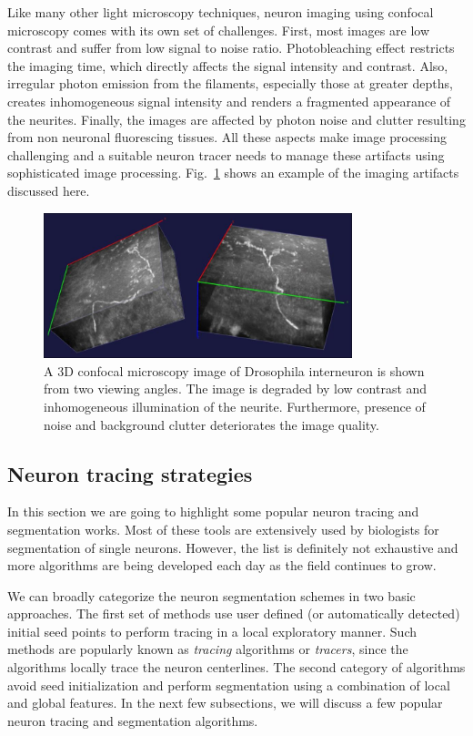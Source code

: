 Like many other light microscopy techniques, neuron imaging using confocal microscopy comes with its own set of challenges. First, most images are low contrast and suffer from low signal to noise ratio. Photobleaching effect restricts the imaging time, which directly affects the signal intensity and contrast. Also, irregular photon emission from the filaments, especially those at greater depths, creates inhomogeneous signal intensity and renders a fragmented appearance of the neurites. Finally, the images are affected by photon noise and clutter resulting from non neuronal fluorescing tissues. All these aspects make image processing challenging and a suitable neuron tracer needs to manage these artifacts using sophisticated image processing.  Fig.~\ref{fig:neuron_stack_demo} shows an example of the imaging artifacts discussed here.
\begin{figure}[t]
\centering
\includegraphics[width=0.8\textwidth]{images/3D_demo}	
\caption[Imaging artifacts]{A 3D confocal microscopy image of Drosophila interneuron is shown from two viewing angles. The image is degraded by low contrast and inhomogeneous illumination of the neurite. Furthermore, presence of noise and background clutter deteriorates the image quality.}
\label{fig:neuron_stack_demo}
\end{figure}

\subsection{Neuron tracing strategies}
In this section we are going to highlight some popular neuron tracing and segmentation works. Most of these tools are extensively used by biologists for segmentation of single neurons. However, the list is  definitely not exhaustive and more algorithms are being developed each day as the field continues to grow.

We can broadly categorize the neuron segmentation schemes in two basic approaches. The first set of methods use user defined (or automatically detected) initial seed points to perform tracing in a local exploratory manner. Such methods are popularly known as \textit{tracing} algorithms or \textit{tracers}, since the algorithms locally trace the neuron centerlines. The second category of algorithms avoid seed initialization and perform segmentation using a combination of local and global features. In the next few subsections, we will discuss a few popular neuron tracing and segmentation algorithms. 

